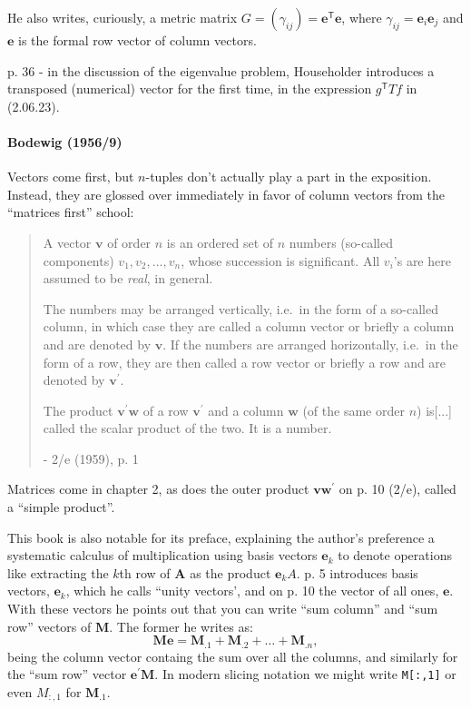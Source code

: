 He also writes, curiously, a metric matrix $G = (\gamma_{ij}) = \mathbf e^{\mathsf T} \mathbf e$,
where $\gamma_{ij} = \mathbf e_i \mathbf e_j$ and $\mathbf e$ is the formal row
vector of column vectors.

p. 36 - in the discussion of the eigenvalue problem, Householder introduces a
transposed (numerical) vector for the first time, in the expression $g^{\mathsf
T}Tf$ in (2.06.23).



\paragraph{Bodewig (1956/9)~\cite{Bodewig1956}}

Vectors come first, but $n$-tuples don't actually play a part in the exposition.
Instead, they are glossed over immediately in favor of column vectors from the
``matrices first'' school:

\begin{quote}
A vector $\mathbf v$ of order $n$ is an ordered set of $n$ numbers (so-called
components) $v_1, v_2, \dots, v_n$, whose succession is significant. All $v_i$'s are here
assumed to be \textit{real}, in general.

The numbers may be arranged vertically, i.e.\ in the form of a so-called
column, in which case they are called a column vector or briefly a
column and are denoted by $\mathbf v$. If the numbers are arranged horizontally,
i.e.\ in the form of a row, they are then called a row vector or briefly a
row and are denoted by $\mathbf v^\prime$.

The product $\mathbf v^\prime \mathbf w$ of a row $\mathbf v^\prime$ and a column
$\mathbf w$ (of the same order $n$) is[...] called the scalar product of the two. It is a number.

- 2/e (1959), p. 1
\end{quote}

Matrices come in chapter 2, as does the outer product $\mathbf v \mathbf w^\prime$
on p. 10 (2/e), called a ``simple product''.

This book is also notable for its preface, explaining the author's preference a
systematic calculus of multiplication using basis vectors $\mathbf e_k$ to denote
operations like extracting the $k$th row of $\mathbf A$ as the product $\mathbf e_k A$.
p. 5 introduces basis vectors, $\mathbf e_k$, which he calls ``unity vectors',
and on p. 10 the vector of all ones, $\mathbf e$. With these vectors he points
out that you can write ``sum column'' and ``sum row'' vectors of $\mathbf M$. The
former he writes as:
\[
\mathbf{Me} = \mathbf M_{.1} + \mathbf M_{.2} + \dots + \mathbf M_{.n},
\]
being the column vector containg the sum over all the columns, and similarly for
the ``sum row'' vector $\mathbf{e^\prime M}$. In modern slicing notation we might
write \verb|M[:,1]| or even $M_{:,1}$ for $\mathbf M_{.1}$.

